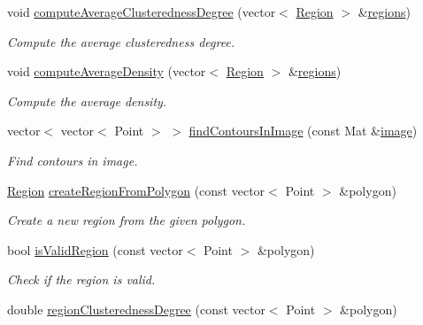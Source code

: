 \begin{DoxyCompactItemize}
void \hyperlink{classmultiscale_1_1analysis_1_1RegionDetector_a5ad71a8af2beb1a02573d0c125af4e16}{compute\-Average\-Clusteredness\-Degree} (vector$<$ \hyperlink{classmultiscale_1_1analysis_1_1Region}{\-Region} $>$ \&\hyperlink{classmultiscale_1_1analysis_1_1RegionDetector_aa6517ceb3a58295448d32e6e41499893}{regions})
\begin{DoxyCompactList}\small\item\em \-Compute the average clusteredness degree. \end{DoxyCompactList}\item 
void \hyperlink{classmultiscale_1_1analysis_1_1RegionDetector_a3f1171daf4a952d12d573ab9d0838490}{compute\-Average\-Density} (vector$<$ \hyperlink{classmultiscale_1_1analysis_1_1Region}{\-Region} $>$ \&\hyperlink{classmultiscale_1_1analysis_1_1RegionDetector_aa6517ceb3a58295448d32e6e41499893}{regions})
\begin{DoxyCompactList}\small\item\em \-Compute the average density. \end{DoxyCompactList}\item 
vector$<$ vector$<$ \-Point $>$ $>$ \hyperlink{classmultiscale_1_1analysis_1_1RegionDetector_a19918b5cd0ec310ad6149c7345870b3f}{find\-Contours\-In\-Image} (const \-Mat \&\hyperlink{classmultiscale_1_1analysis_1_1Detector_a523830a6cfe409694ce8327c3c736fbd}{image})
\begin{DoxyCompactList}\small\item\em \-Find contours in image. \end{DoxyCompactList}\item 
\hyperlink{classmultiscale_1_1analysis_1_1Region}{\-Region} \hyperlink{classmultiscale_1_1analysis_1_1RegionDetector_a1416b365f921e02e5161d72b0b69f287}{create\-Region\-From\-Polygon} (const vector$<$ \-Point $>$ \&polygon)
\begin{DoxyCompactList}\small\item\em \-Create a new region from the given polygon. \end{DoxyCompactList}\item 
bool \hyperlink{classmultiscale_1_1analysis_1_1RegionDetector_a2be058ae797d80787725ae2c246ba256}{is\-Valid\-Region} (const vector$<$ \-Point $>$ \&polygon)
\begin{DoxyCompactList}\small\item\em \-Check if the region is valid. \end{DoxyCompactList}\item 
double \hyperlink{classmultiscale_1_1analysis_1_1RegionDetector_a89995b72e578951ea7ddf43c5c25e14a}{region\-Clusteredness\-Degree} (const vector$<$ \-Point $>$ \&polygon)

\end{DoxyCompactItemize}
